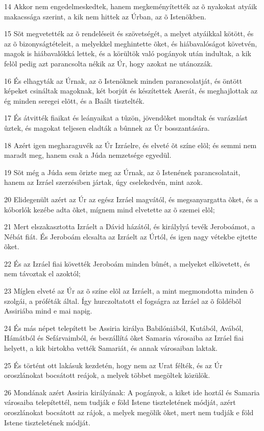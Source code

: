 \par 14 Akkor nem engedelmeskedtek, hanem megkeményítették az õ nyakokat atyáik makacssága szerint, a kik nem hittek az Úrban, az õ Istenökben.
\par 15 Sõt megvetették az õ rendeléseit és szövetségét, a melyet atyáikkal kötött, és az õ bizonyságtételeit, a melyekkel meghintette õket, és hiábavalóságot követvén, magok is hiábavalókká lettek, és a körültök való pogányok után indultak, a kik felõl pedig azt parancsolta nékik az Úr, hogy azokat ne utánozzák.
\par 16 És elhagyták az Úrnak, az õ Istenöknek minden parancsolatját, és öntött képeket csináltak magoknak, két borjút és készítettek Aserát, és meghajlottak az ég minden seregei elõtt, és a Baált tisztelték.
\par 17 És átvitték fiaikat és leányaikat a tûzön, jövendõket mondtak és varázslást ûztek, és magokat  teljesen eladták a bûnnek az Úr bosszantására.
\par 18 Azért igen megharaguvék az Úr Izráelre, és elveté õt színe elõl; és semmi nem maradt meg, hanem csak a Júda  nemzetsége egyedül.
\par 19 Sõt még a Júda sem õrizte meg az Úrnak, az õ Istenének parancsolatait, hanem az Izráel szerzésiben jártak, úgy cselekedvén, mint azok.
\par 20 Elidegenült azért az Úr az egész Izráel magvától, és megsanyargatta õket, és a kóborlók kezébe adta õket, mígnem mind elvetette az õ szemei elõl;
\par 21 Mert elszakasztotta Izráelt a Dávid házától, és királylyá tevék Jeroboámot, a Nébát fiát. És Jeroboám elcsalta az Izráelt az Úrtól, és igen nagy vétekbe ejtette õket.
\par 22 És az Izráel fiai követték Jeroboám minden bûnét, a melyeket elkövetett, és nem távoztak el azoktól;
\par 23 Míglen elveté az Úr az õ színe elõl az Izráelt, a mint megmondotta minden õ szolgái, a próféták által. Így hurczoltatott el fogságra az Izráel az õ földébõl Assiriába mind e mai napig.
\par 24 És más népet telepített be Assiria királya Babilóniából, Kutából, Avából, Hámátból és Sefárvaimból, és beszállítá õket Samaria városaiba az Izráel fiai helyett, a kik birtokba vették Samariát, és annak városaiban laktak.
\par 25 És történt ott lakásuk kezdetén, hogy nem az Urat félték, és az Úr oroszlánokat bocsátott reájok, a melyek többet megöltek közülök.
\par 26 Mondának azért Assiria királyának: A pogányok, a kiket ide hoztál és Samaria városaiba telepítettél, nem tudják e föld Istene tiszteletének módját, azért oroszlánokat bocsátott az rájok, a melyek megölik õket, mert nem tudják e föld Istene tiszteletének módját.
